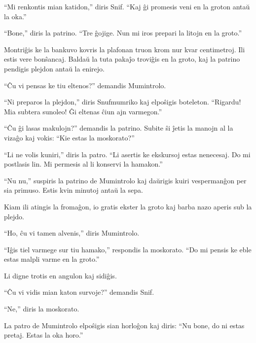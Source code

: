 ``Mi renkontis mian katidon,'' diris Snif. ``Kaj ĝi promesis veni en la groton antaŭ la oka.''

``Bone,'' diris la patrino. ``Tre ĝojige. Nun mi iros prepari la litojn en la groto.''

Montriĝis ke la bankuvo kovris la plafonan truon krom nur kvar centimetroj. Ili estis vere bonŝancaj. Baldaŭ la tuta pakaĵo troviĝis en la groto, kaj la patrino pendigis plejdon antaŭ la enirejo.

``Ĉu vi pensas ke tiu eltenos?'' demandis Mumintrolo.

``Ni preparos la plejdon,'' diris Snufmumriko kaj elpoŝigis boteleton. ``Rigardu! Mia subtera sunoleo! Ĝi eltenas ĉiun ajn varmegon.''

``Ĉu ĝi lasas makulojn?'' demandis la patrino. Subite ŝi ĵetis la manojn al la vizaĝo kaj vokis: ``Kie estas la moskorato?''

``Li ne volis kuniri,'' diris la patro. ``Li asertis ke ekskursoj estas nenecesaj. Do mi postlasis lin. Mi permesis al li konservi la hamakon.''

``Nu nu,'' suspiris la patrino de Mumintrolo kaj daŭrigis kuiri vespermanĝon per sia primuso. Estis kvin minutoj antaŭ la sepa.

\sectionbreak

Kiam ili atingis la fromaĝon, io gratis ekster la groto kaj barba nazo aperis sub la plejdo.

``Ho, ĉu vi tamen alvenis,'' diris Mumintrolo.

``Iĝis tiel varmege sur tiu hamako,'' respondis la moskorato. ``Do mi pensis ke eble estas malpli varme en la groto.''

Li digne trotis en angulon kaj sidiĝis.

``Ĉu vi vidis mian katon survoje?'' demandis Snif.

``Ne,'' diris la moskorato.

La patro de Mumintrolo elpoŝigis sian horloĝon kaj diris: ``Nu bone, do ni estas pretaj. Estas la oka horo.''

